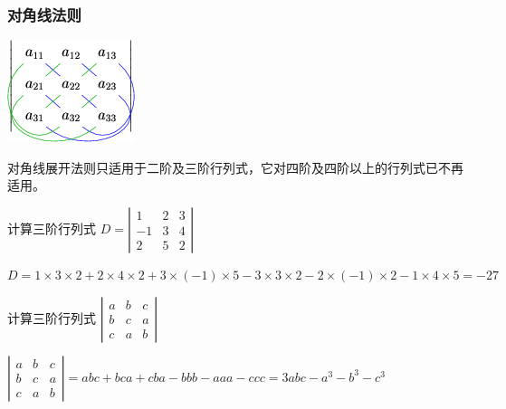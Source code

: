 \subsubsection{对角线法则}

\begin{marginfigure}[3em]
	\includegraphics[width=\marginparwidth]{figures/对角线法则.png}
\end{marginfigure}

\begin{remark}
    对角线展开法则只适用于二阶及三阶行列式，它对四阶及四阶以上的行列式已不再适用。
\end{remark}
\begin{example}
    计算三阶行列式
    $D=\left|\begin{array}{ccc}
            1  & 2 & 3 \\
            -1 & 3 & 4 \\
            2  & 5 & 2
        \end{array}\right| $
\end{example}
\begin{solution}
    $ D=1\times 3\times 2 +2\times4\times2+3 \times (-1)\times 5 -3\times 3 \times2 -2\times (-1)\times 2 -1\times 4\times 5=-27$
\end{solution}

\begin{example}
    计算三阶行列式
    $\left|\begin{array}{ccc}
            a & b & c \\
            b & c & a \\
            c & a & b
        \end{array}\right| $
\end{example}
\begin{solution}
    $ \left|\begin{array}{ccc}
            a & b & c \\
            b & c & a \\
            c & a & b
        \end{array}\right|=abc+bca+cba-bbb-aaa-ccc=3abc-a^{3}-b^{3}-c^{3}$
\end{solution}

